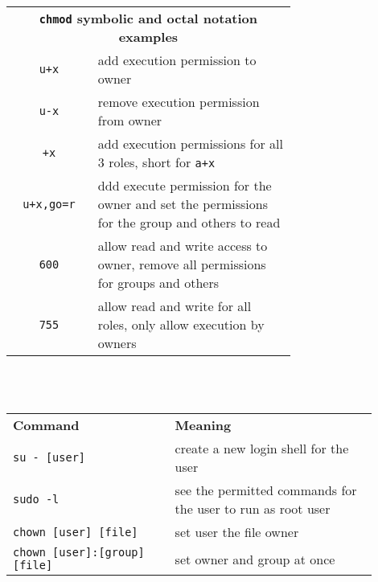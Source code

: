 \documentclass[landscape,a0paper,fontscale=0.285]{baposter} %
\begin{document}
\begin{poster}
{\begin{tabular}{cp{0.7\linewidth}}
\multicolumn{2}{c}{\small{\textbf{\texttt{chmod} symbolic and octal notation examples}}} \\
     \texttt{\small{u+x}} & add execution permission to owner \\
     \texttt{\small{u-x}} & remove execution permission from owner \\
     \texttt{\small{+x}} & add execution permissions for all 3 roles, short for \texttt{\small{a+x}} \\
     \texttt{\small{u+x,go=r}} & ddd execute permission for the owner and set the permissions for the group and others to read \\
     \texttt{\small{600}} & allow read and write access to owner, remove all permissions for groups and others \\
     \texttt{\small{755}} & allow read and write for all roles, only allow execution by owners  \\
\end{tabular}\\



 \\

\begin{tabular}{p{0.4\linewidth}p{0.5\linewidth}}
\multicolumn{1}{l}{\textbf{Command}} & \multicolumn{1}{l}{\textbf{Meaning}} \\
\texttt{\small{su - [user]}} & create a
new login shell for the user  \\
\texttt{\small{sudo -l}} & see the permitted commands for
the user to run as root user  \\
\texttt{\small{chown [user] [file]}} & set user the file owner \\
\texttt{\small{chown [user]:[group] [file]}} & set owner and group at once
\end{tabular}
}


\end{poster}
\end{document}
